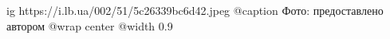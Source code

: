  
 
 
 
 

\ifcmt
  ig https://i.lb.ua/002/51/5c26339bc6d42.jpeg
	@caption Фото: предоставлено автором
  @wrap center
  @width 0.9
\fi
